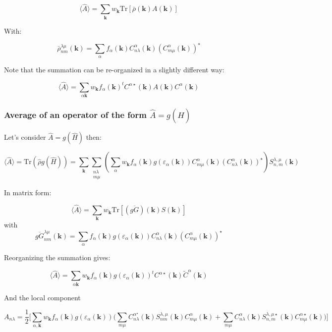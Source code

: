 \documentclass{article}
\newcommand{\op}[1]{\hat{#1}}
\begin{document}
\[ \langle \op{A} \rangle=\sum_{\mathbf{k}} w_{\mathbf{k}} \text{Tr} \left[\bar{\rho}(\mathbf{k}) A(\mathbf{k}) \right] \]

\noindent
With:

\[ \bar{\rho}_{nm}^{\lambda \mu}(\mathbf{k})=  \sum_{\alpha}  f_{\alpha}(\mathbf{k})
C_{n \lambda}^{\alpha}(\mathbf{k})(C_{m \mu}^{\alpha}(\mathbf{k}))^{\star}    \]

\noindent
Note that the summation can be re-organized in a slightly different way:

\[\langle \op{A} \rangle =\sum_{\alpha \mathbf{k}} w_{\mathbf{k}} f_{\alpha}(\mathbf{k})
^tC^{\alpha \star}(\mathbf{k}) A(\mathbf{k}) C^{\alpha}(\mathbf{k}) \]


\subsubsection{Average of an operator of the form $\op{A}=g(\op{H})$}

\noindent
Let's consider $\op{A}=g(\op{H})$ then:


\[ \langle \op{A} \rangle =\mbox{Tr} (\op{\rho} g(\op{H}))= \sum_{\mathbf{k}}
\sum_{\substack{n \lambda\\ m \mu}}\left(
\sum_{\alpha} w_{\mathbf{k}}f_{\alpha}(\mathbf{k})g(\varepsilon_{\alpha}(\mathbf{k}))
 C_{m\mu}^{\alpha}(\mathbf{k}) (C_{n \lambda}^{\alpha}(\mathbf{k}))^{\star} \right)  S_{n,m}^{\lambda,\mu}(\mathbf{k})\]


\noindent
In matrix form:

\[\langle \op{A} \rangle = \sum_{\mathbf{k}} w_{\mathbf{k}}\mbox{Tr} 
 \left[(\overline{gG})(\mathbf{k}) S(\mathbf{k}) \right] \] 
\noindent
with
\[ \overline{gG}_{n m}^{\lambda \mu}(\mathbf{k})=  \sum_{\alpha} f_{\alpha}(\mathbf{k})
g(\varepsilon_{\alpha}(\mathbf{k}))C_{n \lambda}^{\alpha}(\mathbf{k})(C_{m \mu}^{\alpha}(\mathbf{k}))^{\star}    \]

\noindent
Reorganizing the summation gives:

\[\langle \op{A} \rangle=
\sum_{\alpha \mathbf{k}} w_{\mathbf{k}}
f_{\alpha}(\mathbf{k})g(\varepsilon_{\alpha}(\mathbf{k})) 
^tC^{\alpha \star}(\mathbf{k})\widetilde{C}^{\alpha}(\mathbf{k}) \]

\noindent
And the local component

\[ A_{n \lambda}=\frac{1}{2}\Bigg[\sum_{\alpha,\mathbf{k}} w_{\mathbf{k}}
f_{\alpha}(\mathbf{k})g(\varepsilon_{\alpha}(\mathbf{k})) 
\Bigg(\sum_{m \mu} C_{n \lambda}^{\alpha ^{\star}}(\mathbf{k})S_{nm}^{\lambda,\mu}(\mathbf{k})C_{m \mu}^{\alpha}(\mathbf{k}) + \sum_{m
\mu} C_{n \lambda}^{\alpha}(\mathbf{k})S_{n,m}^{\lambda,\mu
\star}(\mathbf{k})C_{m \mu}^{\alpha \star}(\mathbf{k})\Bigg) \Bigg]\]
\end{document}
